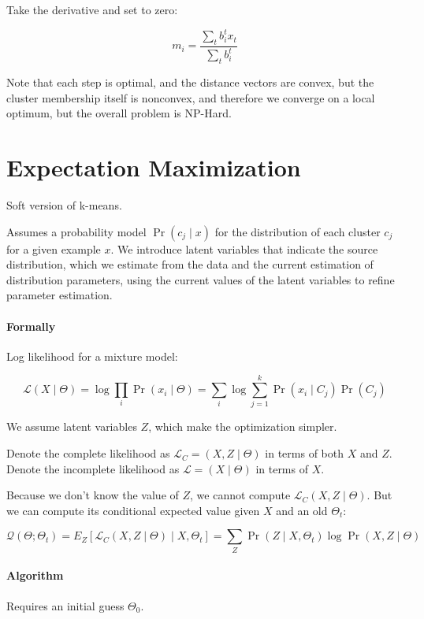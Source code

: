 \documentclass{idc_msc}
\begin{document}
Take the derivative and set to zero:

\[m_i = \frac{\sum_t b_i^t x_t}{\sum_t b_i^t}\]

Note that each step is optimal, and the distance vectors are convex, but the cluster membership itself is nonconvex, and therefore we converge on a local optimum, but the overall problem is NP-Hard.

\section{Expectation Maximization}

Soft version of k-means.

Assumes a probability model \(\Pr(c_j \mid x)\) for the distribution of each cluster \(c_j\) for a given example \(x\).
We introduce latent variables that indicate the source distribution, which we estimate from the data and the current estimation of distribution parameters, using the current values of the latent variables to refine parameter estimation.

\paragraph{Formally}

Log likelihood for a mixture model:

\[
  \mathcal{L}(X \mid \Theta) = \log \prod_i \Pr(x_i \mid \Theta) = \sum_i \log \sum_{j=1}^k \Pr(x_i \mid C_j) \Pr(C_j)
\]

We assume latent variables \(Z\), which make the optimization simpler.

Denote the complete likelihood as \(\mathcal{L}_C = (X, Z \mid \Theta)\) in terms of both \(X\) and \(Z\).
Denote the incomplete likelihood as \(\mathcal{L} = (X \mid \Theta)\) in terms of \(X\).

Because we don't know the value of \(Z\), we cannot compute \(\mathcal{L}_C(X, Z \mid \Theta)\).
But we can compute its conditional expected value given \(X\) and an old \(\Theta_t\):

\[
  \mathcal{Q}(\Theta ; \Theta_t)
  = E_Z [\mathcal{L}_C(X,Z\mid \Theta) \mid X, \Theta_t]
  = \sum_Z \Pr(Z \mid X, \Theta_t) \log \Pr(X,Z \mid \Theta)
\]

\paragraph{Algorithm}

Requires an initial guess \(\Theta_0\).
\end{document}
